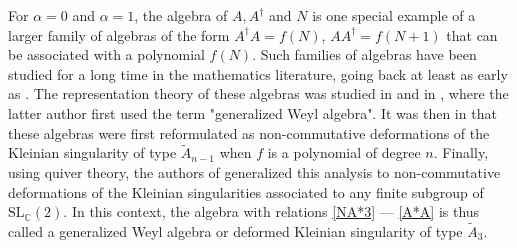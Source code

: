 \documentclass{article}
\def \Cs {\mathbb{C}}
\begin{document}
For $\alpha=0$ and $\alpha = 1$, the algebra of $A,A^\dagger$ and $N$ is one special example of a larger family of 
algebras of the form $ A^{\dagger}A = f(N)$, $A A^{\dagger}  = f(N+1)$ that can be associated 
with a polynomial $f(N)$. Such families of algebras have been studied for a long time in the 
mathematics literature, going back at least as early as \cite[\S 3]{joseph1977generalization}. 
The representation theory of these algebras was studied in \cite{smith1990class} and in
\cite{bavula1992generalized}, where the latter author first used the term "generalized Weyl 
algebra". It was then in \cite{hodges1993noncommutative} that these algebras were first reformulated as 
non-commutative deformations of the Kleinian singularity of type $\tilde{A}_{n-1}$ when $f$
is a polynomial of degree $n$. Finally, using quiver theory, the authors of \cite{crawley1998noncommutative} 
generalized this analysis to non-commutative deformations of the Kleinian singularities 
associated to any finite subgroup of $\mathrm{SL}_{\Cs}(2)$. In this 
context, the algebra with relations \eqref{NA*3} --- \eqref{A*A} is thus called a generalized 
Weyl algebra or deformed Kleinian singularity of type $\tilde{A}_3$.
\end{document}
